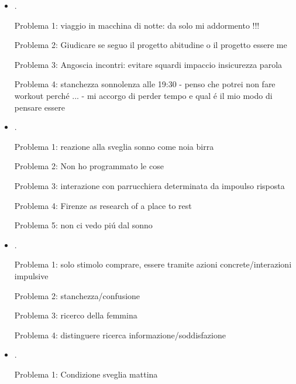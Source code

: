 \begin{itemize}
Problema 2: angoscia telefonata RG

Problema 3: cerco di perdere ancora tempo

Problema 4: scegliere i vestiti nei panni di chi guarda

Problema 5: confusione generata dal ragazzo che descrive il prodotto

Problema 6: : acidit\'a nausea svenimento tosse costrizione bronchiale peggerota dal fare cena durata cira 40 min. dopo workout


\item {}.

Problema 1: viaggio in macchina di notte: da solo mi addormento !!!

Problema 2: Giudicare se seguo il progetto abitudine o il progetto essere me

Problema 3: Angoscia incontri: evitare squardi impaccio insicurezza parola

Problema 4: stanchezza sonnolenza alle 19:30 - penso che potrei non fare workout perch\'e ... - mi accorgo di perder tempo e qual \'e il mio modo di pensare essere

\item {}.

Problema 1: reazione alla sveglia sonno come noia birra

Problema 2: Non ho programmato le cose

Problema 3: interazione con parrucchiera determinata da impoulso risposta

Problema 4: Firenze as research of a place to rest

Problema 5: non ci vedo pi\'u dal sonno

\item {}.

Problema 1: solo stimolo comprare, essere tramite azioni concrete/interazioni impulsive

Problema 2: stanchezza/confusione

Problema 3: ricerco della femmina

Problema 4: distinguere ricerca informazione/soddisfazione


\item {}.

Problema 1: Condizione sveglia mattina 


\end{itemize}
